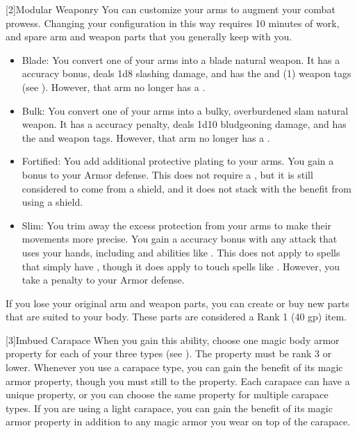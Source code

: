             [2]{Modular Weaponry} You can customize your arms to augment your combat prowess.
            Changing your configuration in this way requires 10 minutes of work, and spare arm and weapon parts that you generally keep with you.
            \begin{itemize}
                \item Blade: You convert one of your arms into a blade natural weapon.
                    It has a  accuracy bonus, deals 1d8 slashing damage, and has the  and  (1) weapon tags (see ).
                    However, that arm no longer has a .
                \item Bulk: You convert one of your arms into a bulky, overburdened slam natural weapon.
                    It has a  accuracy penalty, deals 1d10 bludgeoning damage, and has the  and  weapon tags.
                    However, that arm no longer has a .
                \item Fortified: You add additional protective plating to your arms.
                    You gain a  bonus to your Armor defense.
                    This does not require a , but it is still considered to come from a shield, and it does not stack with the benefit from using a shield.
                \item Slim: You trim away the excess protection from your arms to make their movements more precise.
                    You gain a  accuracy bonus with any attack that uses your hands, including  and abilities like .
                    This does not apply to spells that simply have , though it does apply to touch spells like .
                    However, you take a  penalty to your Armor defense.
            \end{itemize}

            If you lose your original arm and weapon parts, you can create or buy new parts that are suited to your body.
            These parts are considered a Rank 1 (40 gp) item.

            [3]{Imbued Carapace} When you gain this ability, choose one magic body armor property for each of your three  types (see ).
            The property must be rank 3 or lower.
            Whenever you use a carapace type, you can gain the benefit of its magic armor property, though you must still  to the property.
            Each carapace can have a unique property, or you can choose the same property for multiple carapace types.
            If you are using a light carapace, you can gain the benefit of its magic armor property in addition to any magic armor you wear on top of the carapace.

